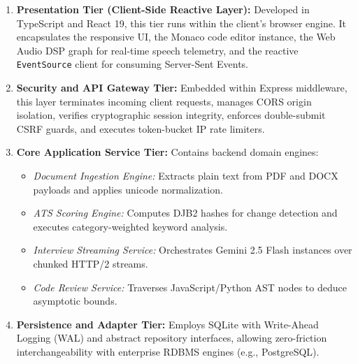 \documentclass[conference]{IEEEtran}
\begin{document}
\begin{enumerate}
    \item \textbf{Presentation Tier (Client-Side Reactive Layer):} Developed in TypeScript and React 19, this tier runs within the client's browser engine. It encapsulates the responsive UI, the Monaco code editor instance, the Web Audio DSP graph for real-time speech telemetry, and the reactive \texttt{EventSource} client for consuming Server-Sent Events.
    \item \textbf{Security and API Gateway Tier:} Embedded within Express middleware, this layer terminates incoming client requests, manages CORS origin isolation, verifies cryptographic session integrity, enforces double-submit CSRF guards, and executes token-bucket IP rate limiters.
    \item \textbf{Core Application Service Tier:} Contains backend domain engines:
    \begin{itemize}
        \item \textit{Document Ingestion Engine:} Extracts plain text from PDF and DOCX payloads and applies unicode normalization.
        \item \textit{ATS Scoring Engine:} Computes DJB2 hashes for change detection and executes category-weighted keyword analysis.
        \item \textit{Interview Streaming Service:} Orchestrates Gemini 2.5 Flash instances over chunked HTTP/2 streams.
        \item \textit{Code Review Service:} Traverses JavaScript/Python AST nodes to deduce asymptotic bounds.
    \end{itemize}
    \item \textbf{Persistence and Adapter Tier:} Employs SQLite with Write-Ahead Logging (WAL) and abstract repository interfaces, allowing zero-friction interchangeability with enterprise RDBMS engines (e.g., PostgreSQL).
\end{enumerate}
\end{document}
